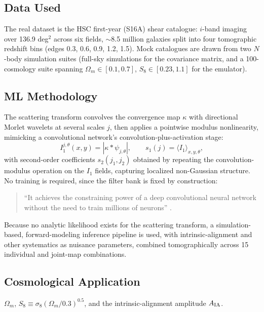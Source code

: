 \documentclass[11pt]{article}
\begin{document}
\subsection{Data Used}
The real dataset is the HSC first-year (S16A) shear catalogue: $i$-band imaging over 136.9 deg$^2$ across six fields, $\sim$8.5 million galaxies split into four tomographic redshift bins (edges 0.3, 0.6, 0.9, 1.2, 1.5). Mock catalogues are drawn from two $N$-body simulation suites (full-sky simulations for the covariance matrix, and a 100-cosmology suite spanning $\Omega_m\in[0.1,0.7]$, $S_8\in[0.23,1.1]$ for the emulator).

\subsection{ML Methodology}
The scattering transform convolves the convergence map $\kappa$ with directional Morlet wavelets at several scales $j$, then applies a pointwise modulus nonlinearity, mimicking a convolutional network's convolution-plus-activation stage:
\begin{equation}
I_1^{j,\theta}(x,y) = |\kappa*\psi_{j,\theta}|,\qquad s_1(j)=\langle I_1\rangle_{x,y,\theta},
\end{equation}
with second-order coefficients $s_2(j_1,j_2)$ obtained by repeating the convolution-modulus operation on the $I_1$ fields, capturing localized non-Gaussian structure. No training is required, since the filter bank is fixed by construction:

\begin{quote}
\enquote{It achieves the constraining power of a deep convolutional neural network without the need to train millions of neurons} \citep[p.~3]{cheng2024scattering}.
\end{quote}

\noindent Because no analytic likelihood exists for the scattering transform, a simulation-based, forward-modeling inference pipeline is used, with intrinsic-alignment and other systematics as nuisance parameters, combined tomographically across 15 individual and joint-map combinations.

\subsection{Cosmological Application}
$\Omega_m$, $S_8\equiv\sigma_8(\Omega_m/0.3)^{0.5}$, and the intrinsic-alignment amplitude $A_{\rm IA}$.
\end{document}
